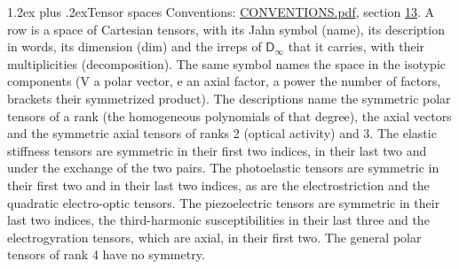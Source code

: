 \documentclass[10pt,a4paper]{article}
\makeatletter
\renewcommand\section{\@startsection{section}{1}{\z@}{-3ex plus -1ex minus -.2ex}%
  {1.2ex plus .2ex}{\normalfont\large\sffamily\bfseries\color{parttitle}}}
\numberwithin{equation}{section}
\newcommand{\grp}[1]{\mathsf{#1}}
\makeatother
\begin{document}
\section{Tensor spaces}\label{s:tensor_spaces}
Conventions: \href{../../CONVENTIONS.pdf}{CONVENTIONS.pdf}, section \href{../../CONVENTIONS.pdf\#conv.13}{13}.
\leavevmode\label{n:head.name}\label{n:head.description}\label{n:head.dim}\label{n:head.decomposition}A row is a space of Cartesian tensors, with its Jahn symbol (name), its description in words, its dimension (dim) and the irreps of $\grp{D_{\infty}}$ that it carries, with their multiplicities (decomposition). \label{n:label.jahn}The same symbol names the space in the isotypic components (V a polar vector, e an axial factor, a power the number of factors, brackets their symmetrized product). The descriptions name the symmetric polar tensors of a rank (the homogeneous polynomials of that degree), the axial vectors and the symmetric axial tensors of ranks 2 (optical activity) and 3. The elastic stiffness tensors are symmetric in their first two indices, in their last two and under the exchange of the two pairs. The photoelastic tensors are symmetric in their first two and in their last two indices, as are the electrostriction and the quadratic electro-optic tensors. The piezoelectric tensors are symmetric in their last two indices, the third-harmonic susceptibilities in their last three and the electrogyration tensors, which are axial, in their first two. The general polar tensors of rank 4 have no symmetry.
\end{document}
